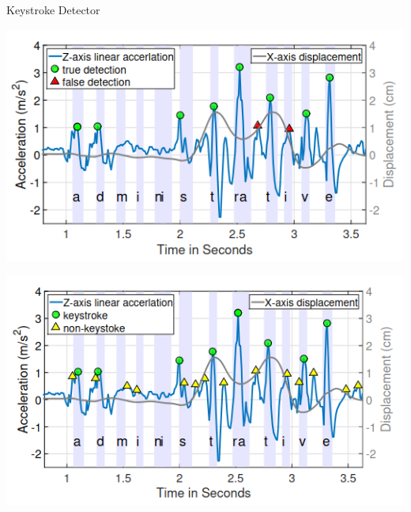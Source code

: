 \documentclass[ucs,9pt]{beamer}
\begin{document}
\begin{frame}{Keystroke Detector}
	
	
	\begin{minipage}[c]{0.49\linewidth}
		\includegraphics[width=\textwidth]{imgs/peakdetection}
	\end{minipage}
	\begin{minipage}[c]{0.49\linewidth}
		\includegraphics[width=\textwidth]{imgs/baggedDecision}

\end{minipage}
\end{frame}
\end{document}
